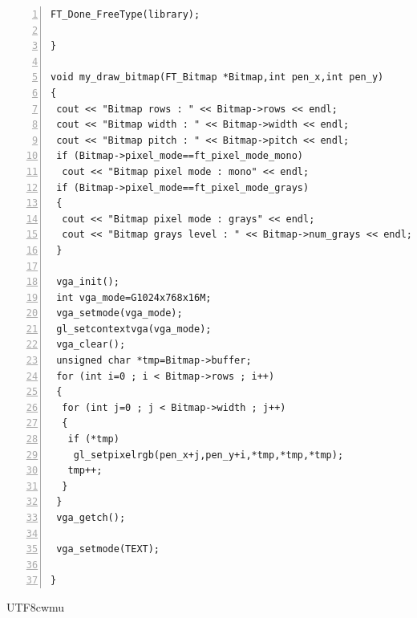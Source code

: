 \documentclass[12pt,a4]{article}
\begin{document}
\begin{CJK}{UTF8}{bsmi}
\begin{Verbatim}[commandchars=@\^?,numbers=left]
 FT_Done_FreeType(library);

}

void my_draw_bitmap(FT_Bitmap *Bitmap,int pen_x,int pen_y)
{
 cout << "Bitmap rows : " << Bitmap->rows << endl;
 cout << "Bitmap width : " << Bitmap->width << endl;
 cout << "Bitmap pitch : " << Bitmap->pitch << endl;
 if (Bitmap->pixel_mode==ft_pixel_mode_mono)
  cout << "Bitmap pixel mode : mono" << endl;
 if (Bitmap->pixel_mode==ft_pixel_mode_grays)
 {
  cout << "Bitmap pixel mode : grays" << endl;
  cout << "Bitmap grays level : " << Bitmap->num_grays << endl;
 }

 vga_init();
 int vga_mode=G1024x768x16M;
 vga_setmode(vga_mode);
 gl_setcontextvga(vga_mode);
 vga_clear();
 unsigned char *tmp=Bitmap->buffer;
 for (int i=0 ; i < Bitmap->rows ; i++)
 {
  for (int j=0 ; j < Bitmap->width ; j++)
  {
   if (*tmp)
    gl_setpixelrgb(pen_x+j,pen_y+i,*tmp,*tmp,*tmp);
   tmp++;
  }
 }
 vga_getch();

 vga_setmode(TEXT);

}
\end{Verbatim}
\end{CJK}{UTF8}{cwmu}
\end{document}
